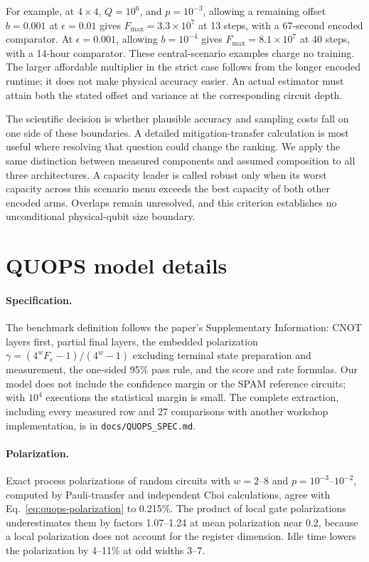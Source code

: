 \documentclass[11pt]{article}
\newcommand{\eps}{\epsilon}
\begin{document}
For example, at $4\times4$, $Q=10^6$, and $p=10^{-3}$, allowing a
remaining offset $b=0.001$ at $\eps=0.01$ gives
$F_{\max}=3.3\times10^7$ at 13 steps, with a 67-second encoded comparator.
At $\eps=0.001$, allowing $b=10^{-4}$ gives
$F_{\max}=8.1\times10^7$ at 40 steps, with a 14-hour comparator.
These central-scenario examples charge no training. The larger affordable
multiplier in the strict case follows from the longer encoded runtime; it
does not make physical accuracy easier. An actual estimator must attain
both the stated offset and variance at the corresponding circuit depth.

The scientific decision is whether plausible accuracy and sampling costs fall
on one side of these boundaries. A detailed mitigation-transfer calculation
is most useful where resolving that question could change the ranking.
We apply the same distinction between measured components and assumed
composition to all three architectures. A capacity leader is called robust
only when its worst capacity across this scenario menu exceeds the best
capacity of both other encoded arms. Overlaps remain unresolved, and this
criterion establishes no unconditional physical-qubit size boundary.


\section{QUOPS model details}\label{app:quops}
\paragraph{Specification.} The benchmark definition follows the paper's
Supplementary Information: CNOT layers first, partial final layers, the
embedded polarization $\gamma=(4^wF_e-1)/(4^w-1)$ excluding terminal state
preparation and measurement, the one-sided 95\% pass rule, and the score and
rate formulas. Our model does not include the confidence margin or the SPAM
reference circuits; with $10^4$ executions the statistical margin is small.
The complete extraction, including every measured row and 27 comparisons with
another workshop implementation, is in \texttt{docs/QUOPS\_SPEC.md}.

\paragraph{Polarization.} Exact process polarizations of random circuits with
$w=2$--8 and $p=10^{-3}$--$10^{-2}$, computed by Pauli-transfer and independent
Choi calculations, agree with Eq.~\eqref{eq:quops-polarization} to 0.215\%. The
product of local gate polarizations underestimates them by factors
1.07--1.24 at mean polarization near 0.2, because a local polarization does not
account for the register dimension. Idle time lowers the polarization by 4--11\%
at odd widths 3--7.
\end{document}
